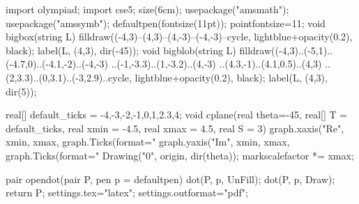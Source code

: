 \usepackage{answers}
\renewcommand{\solutionextension}{out}
\renewenvironment{answeritem}[1]{\item[\bfseries #1.]}{}

\reversemarginpar
\newcommand{\prechili}{\vspace*{0.3em}\hspace*{1.5em}}
\newcommand{\nochili}{\hspace*{1.5em}}
\newcommand{\chili}{\texttt{[image: media/chili.png]}}
\newcommand{\gim}{\marginpar{\prechili\nochili\nochili\chili}}
\newcommand{\yod}{\marginpar{\prechili\nochili\chili\chili}}
\newcommand{\kurumi}{\marginpar{\prechili\chili\chili\chili}}

\makeatletter
\usepackage{etoolbox}
%
\makeatother
\setcounter{tocdepth}{1}
\usepackage[tocindentauto]{tocstyle}

\usepackage{patch-asy}
\renewcommand{\theasy}{\thechapter\Alph{asy}}
\begin{asydef}
	import olympiad;
	import cse5;
	size(6cm);
	usepackage("amsmath");
	usepackage("amssymb");
	defaultpen(fontsize(11pt));
	pointfontsize=11;
	void bigbox(string L) {
		filldraw((-4,3)--(4,3)--(4,-3)--(-4,-3)--cycle,
			lightblue+opacity(0.2), black);
		label(L, (4,3), dir(-45));
	}
	void bigblob(string L) {
		filldraw((-4,3)..(-5,1)..(-4.7,0)..(-4.1,-2)..(-4,-3)
			..(-1,-3.3)..(1,-3.2)..(4,-3)
			..(4.3,-1)..(4.1,0.5)..(4,3)
			..(2,3.3)..(0,3.1)..(-3,2.9)..cycle,
			lightblue+opacity(0.2), black);
		label(L, (4,3), dir(5));
	}

	real[] default_ticks = {-4,-3,-2,-1,0,1,2.3,4};
	void cplane(real theta=-45, real[] T = default_ticks, real xmin = -4.5, real xmax = 4.5, real S = 3) {
		graph.xaxis("Re", xmin, xmax, graph.Ticks(format="%
		graph.yaxis("Im", xmin, xmax, graph.Ticks(format="%
		Drawing("0", origin, dir(theta));
		markscalefactor *= xmax;
	}

	pair opendot(pair P, pen p = defaultpen) {
		dot(P, p, UnFill);
		dot(P, p, Draw);
		return P;
	}
	settings.tex="latex";
	settings.outformat="pdf";
\end{asydef}
\def\asydir{asy}

